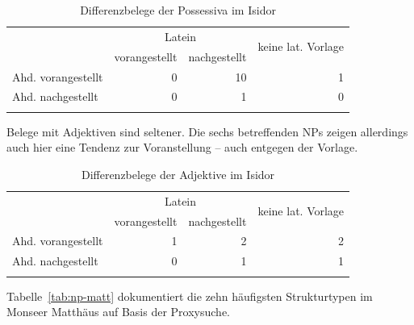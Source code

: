 \begin{table}
\centering
\begin{tabular}{lrrr}
\lsptoprule
                   & \multicolumn{2}{c}{Latein} & \multirow{2}{*}{keine lat. Vorlage}\\
 \cmidrule(lr){2-3}
                   & vorangestellt & nachgestellt & \\ \midrule
Ahd. vorangestellt & 0                  & 10                 & 1                    \\
Ahd. nachgestellt  & 0                  & 1                 & 0                    \\ \lspbottomrule
\end{tabular}
\caption{Differenzbelege der Possessiva im Isidor}
\label{tab:diff-poss-isidor}
\end{table}

Belege mit Adjektiven sind seltener. Die sechs betreffenden NPs zeigen allerdings auch hier eine Tendenz zur Voranstellung -- auch entgegen der Vorlage. 

\begin{table}
\centering
\begin{tabular}{lrrr}
\lsptoprule
                   & \multicolumn{2}{c}{Latein} & \multirow{2}{*}{keine lat. Vorlage}\\
 \cmidrule(lr){2-3}
                   & vorangestellt & nachgestellt & \\ \midrule
Ahd. vorangestellt & 1                  & 2                 & 2                    \\
Ahd. nachgestellt  & 0                  & 1                 & 1                    \\ \lspbottomrule
\end{tabular}
\caption{Differenzbelege der Adjektive im Isidor}
\label{tab:diff-adj.-isidor}
\end{table}


Tabelle~\ref{tab:np-matt} dokumentiert die zehn häufigsten Strukturtypen im Monseer Matthäus auf Basis der Proxysuche. 

